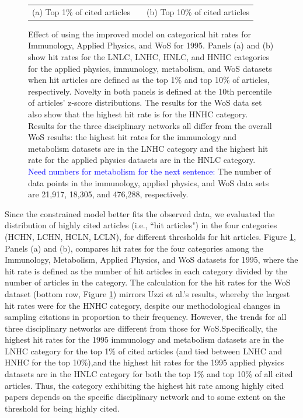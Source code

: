 \documentclass[NETN]{stjour}
\begin{document}
\begin{figure}
\begin{tabular}{ccc}
(a) Top 1\% of cited articles & & (b) Top 10\% of cited articles \\
\end{tabular}
\caption{Effect of using the improved model on  categorical hit rates for Immunology, Applied Physics, and WoS for 1995. Panels (a) and (b) show hit rates for the LNLC, LNHC, HNLC, and HNHC categories for the applied physics, immunology, metabolism, and WoS datasets when hit articles are defined as the top 1\% and top 10\% of articles, respectively.  Novelty in both panels is defined at the 10th percentile of articles' z-score distributions. 
The results for the WoS data set also show that the highest hit rate is for the HNHC category.  Results for the three disciplinary networks all differ from the overall WoS results: the highest hit rates for the immunology and metabolism datasets  are in the LNHC category and the highest hit rate for the applied physics datasets are in the HNLC category.  
\textcolor{blue}{Need numbers for metabolism for the next sentence:} The number of data points in the immunology, applied physics, and WoS data sets are 21,917, 18,305, and 476,288, respectively.  
}
\label{fig:Fig2}
\end{figure}

Since the constrained model better fits the observed data, we evaluated the distribution of highly cited articles  (i.e., ``hit articles") in the four categories (HCHN, LCHN, HCLN, LCLN), for different thresholds for hit articles. Figure \ref{fig:Fig2}, Panels (a) and (b), compares hit rates for the four categories among the Immunology, Metabolism, Applied Physics, and WoS datasets for 1995, where the hit rate is defined as the number of hit articles in each category divided by the number of articles in the category. 
The calculation for the hit rates for the WoS dataset (bottom row, Figure \ref{fig:Fig2}) mirrors Uzzi et al.'s results, whereby the largest hit rates were for the HNHC category, despite our methodological changes in sampling citations in proportion to their frequency.  However, the trends  for all three  disciplinary networks  are different from those for WoS.Specifically, the highest hit rates for the 1995 immunology and metabolism datasets are in the LNHC category for the top 1\% of cited articles (and tied between LNHC and HNHC for the top 10\%),and the highest hit rates for the 1995 applied physics datasets are in the HNLC category for both the top 1\% and top 10\% of all cited articles.  Thus, the category exhibiting the highest hit rate among highly cited papers depends on the specific disciplinary network and to some extent on the threshold for being highly cited.
 
\end{document}
